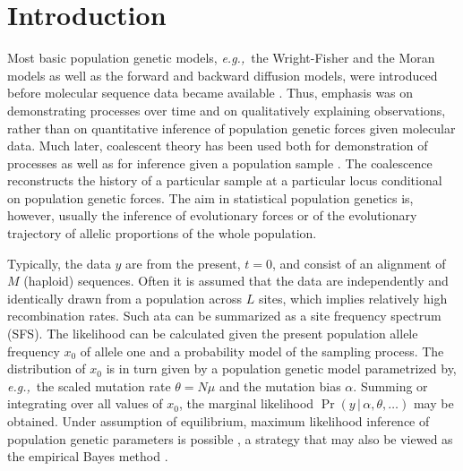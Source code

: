 \documentclass[preprint]{elsarticle}
\newcommand\given{{\,|\,}}
\newcommand\eg{{\it e.g.,}}
\newcommand\x[1]{\ensuremath{x_{#1}}}
\newcommand\y{\ensuremath{y}}
\begin{document}
\linenumbers

\listoftodos

\section{Introduction}

Most basic population genetic models, \eg\ the Wright-Fisher and the Moran models as well as the forward and backward diffusion models, were introduced before molecular sequence data became available \citep[reviewed in][]{Ewen04}. Thus, emphasis was on demonstrating processes over time and on qualitatively explaining observations, rather than on quantitative inference of population genetic forces given molecular data. Much later, coalescent theory \citep{King82} has been used both for demonstration of processes as well as for inference given a population sample \citep{Hein05,Wake09}. The coalescence reconstructs the history of a particular sample at a particular locus conditional on population genetic forces. The aim in statistical population genetics is, however, usually the inference of evolutionary forces or of the evolutionary trajectory of allelic proportions of the whole population.


Typically, the data $\y$ are from the present, $t=0$, and consist of an alignment of $M$ (haploid) sequences. Often it is assumed that the data are independently and identically drawn from a population across $L$ sites, which implies relatively high recombination rates. Such ata can be summarized as a site frequency spectrum (SFS). The likelihood can be calculated given the present population allele frequency $\x{0}$ of allele one and a probability model of the sampling process. The distribution of $\x{0}$ is in turn given by a population genetic model parametrized by, \eg\ the scaled mutation rate $\theta=N\mu$ and the mutation bias $\alpha$. Summing or integrating over all values of $\x{0}$, the marginal likelihood $\Pr(\y\given \alpha,\theta,\dots)$ may be obtained. Under assumption of equilibrium, maximum likelihood inference of population genetic parameters is possible \citep{Vogl14b,Vogl15}, a strategy that may also be viewed as the empirical Bayes method \citep[\eg][]{Carl00}. 
\end{document}
